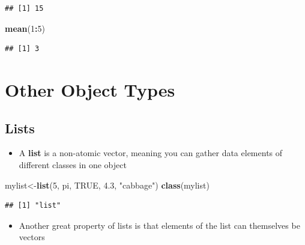 \documentclass[]{book}
\newenvironment{Shaded}{\begin{snugshade}}{\end{snugshade}}
\newcommand{\KeywordTok}[1]{\textcolor[rgb]{0.13,0.29,0.53}{\textbf{#1}}}
\newcommand{\DecValTok}[1]{\textcolor[rgb]{0.00,0.00,0.81}{#1}}
\newcommand{\FloatTok}[1]{\textcolor[rgb]{0.00,0.00,0.81}{#1}}
\newcommand{\StringTok}[1]{\textcolor[rgb]{0.31,0.60,0.02}{#1}}
\newcommand{\OtherTok}[1]{\textcolor[rgb]{0.56,0.35,0.01}{#1}}
\newcommand{\OperatorTok}[1]{\textcolor[rgb]{0.81,0.36,0.00}{\textbf{#1}}}
\newcommand{\NormalTok}[1]{#1}
\providecommand{\tightlist}{%
  \setlength{\itemsep}{0pt}\setlength{\parskip}{0pt}}
\theoremstyle{definition}
\theoremstyle{definition}
\theoremstyle{definition}
\theoremstyle{remark}
\begin{document}
\begin{verbatim}
## [1] 15
\end{verbatim}

\begin{Shaded}
\begin{Highlighting}[]
\KeywordTok{mean}\NormalTok{(}\DecValTok{1}\OperatorTok{:}\DecValTok{5}\NormalTok{)}
\end{Highlighting}
\end{Shaded}

\begin{verbatim}
## [1] 3
\end{verbatim}

\chapter{Other Object Types}\label{other-object-types}

\section{Lists}\label{lists}

\begin{itemize}
\tightlist
\item
  A \textbf{list} is a non-atomic vector, meaning you can gather data
  elements of different classes in one object
\end{itemize}

\begin{Shaded}
\begin{Highlighting}[]
\NormalTok{mylist<-}\KeywordTok{list}\NormalTok{(}\DecValTok{5}\NormalTok{, pi, }\OtherTok{TRUE}\NormalTok{, }\FloatTok{4.3}\NormalTok{, }\StringTok{"cabbage"}\NormalTok{)}
\KeywordTok{class}\NormalTok{(mylist)}
\end{Highlighting}
\end{Shaded}

\begin{verbatim}
## [1] "list"
\end{verbatim}

\begin{itemize}
\tightlist
\item
  Another great property of lists is that elements of the list can
  themselves be vectors
\end{itemize}
\end{document}
